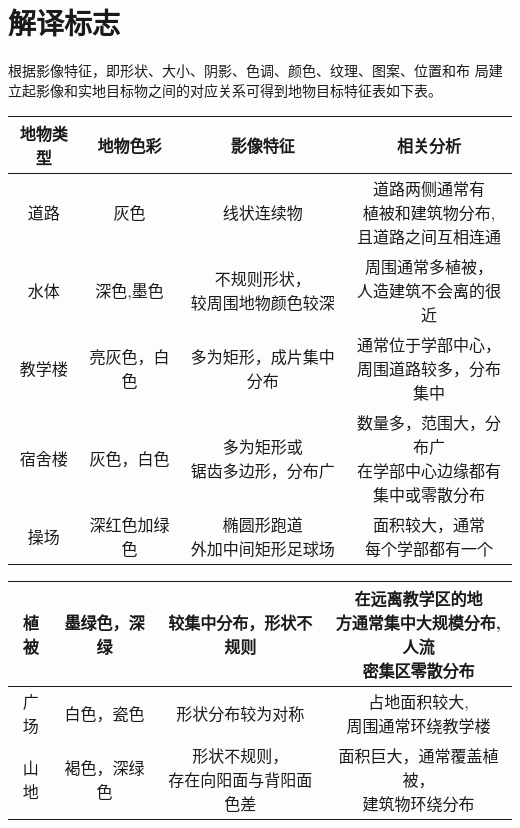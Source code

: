 \documentclass{ctexart}
\begin{document}
\section{解译标志}
根据影像特征，即形状、大小、阴影、色调、颜色、纹理、图案、位置和布
局建立起影像和实地目标物之间的对应关系可得到地物目标特征表如下表。
\begin{table}[H]
	\centering
	\begin{tabular}{|c|c|c|c|}
	\hline
	\textbf{地物类型}&\textbf{地物色彩}&\textbf{影像特征}&\textbf{相关分析
}\\
	\hline
	道路&灰色&线状连续物&\makecell*[c]{道路两侧通常有\\植被和建筑物分布,\\且道路之间互相连通}\\
	\hline
	水体&深色,墨色&\makecell*[c]{不规则形状，\\较周围地物颜色较深}&\makecell*[c]{周围通常多植被，\\人造建筑不会离的很近} \\
	\hline
	教学楼&亮灰色，白色&多为矩形，成片集中分布&\makecell*[c]{通常位于学部中心，\\周围道路较多，分布集中}\\
	\hline
	宿舍楼&灰色，白色&\makecell*[c]{多为矩形或\\锯齿多边形，分布广}&\makecell*[c]{数量多，范围大，分布广\\在学部中心边缘都有\\集中或零散分布}\\
	\hline
	操场&深红色加绿色&\makecell*[c]{椭圆形跑道\\外加中间矩形足球场}&\makecell*[c]{面积较大，通常\\每个学部都有一个}\\
	\hline
	\end{tabular}
\end{table}
\begin{table}[H]
	\centering
	\begin{tabular}{|c|c|c|c|}
	\hline
	植被&墨绿色，深绿&较集中分布，形状不规则&\makecell*[c]{在远离教学区的地\\方通常集中大规模分布,人流\\密集区零散分布}\\
	\hline
	广场&白色，瓷色&形状分布较为对称&\makecell*[c]{占地面积较大,\\周围通常环绕教学楼}\\
	\hline
	山地&褐色，深绿色&\makecell*[c]{形状不规则，\\存在向阳面与背阳面色差}&\makecell*[c]{面积巨大，通常覆盖植被，\\建筑物环绕分布}\\
	\hline
	\end{tabular}
\end{table}
\end{document}
